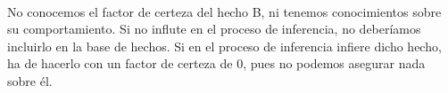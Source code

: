 \documentclass[a4paper,11pt, includehead]{article}
\begin{document}
\clearpage

\\

No conocemos el factor de certeza del hecho B, ni tenemos conocimientos  sobre su comportamiento. Si no influte en el proceso de inferencia, no deberíamos incluirlo en la base de hechos. Si en el proceso de inferencia infiere dicho hecho, ha de hacerlo con un factor de certeza de 0, pues no podemos asegurar nada sobre él.




\end{document}
